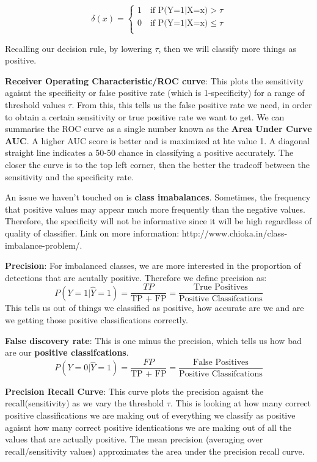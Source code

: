 \documentclass[11pt, oneside]{article}
\theoremstyle{definition}
\begin{document}
\[
\delta(x) = \left\{
\begin{array}{ll}
      1  \quad \textrm{if P(Y=1$|$X=x)} > \tau \\
      0  \quad \textrm{if P(Y=1$|$X=x)} \leq \tau\\
\end{array}
\right.
\]

Recalling our decision rule, by lowering $\tau$, then we will classify more things as positive.

\textbf{Receiver Operating Characteristic/ROC curve}: This plots the sensitivity agaisnt the specificity or false positive rate (which is 1-specificity) for a range of threshold values $\tau$. From this, this tells us the false positive rate we need, in order to obtain a certain sensitivity or true positive rate we want to get. We can summarise the ROC curve as a single number known as the \textbf{Area Under Curve AUC}. A higher AUC score is better and is maximized at hte value 1. A diagonal straight line indicates a 50-50 chance in classifying a positive accurately. The closer the curve is to the top left corner, then the better the tradeoff between the sensitivity and the specificity rate.

An issue we haven't touched on is \textbf{class imabalances}. Sometimes, the frequency that positive values may appear much more frequently than the negative values. Therefore, the specificity will not be informative since it will be high regardless of quality of classifier. Link on more information: http://www.chioka.in/class-imbalance-problem/.

\textbf{Precision}: For imbalanced classes, we are more interested in the proportion of detections that are acutally positive. Therefore we define precision as:
\begin{equation}
  P(Y=1|\hat{Y}=1) = \frac{TP}{\text{TP + FP}} = \frac{\text{True Positives}}{\text{Positive Classifcations}}
\end{equation}
This tells us out of things we classified as positive, how accurate are we and are we getting those positive classifications correctly.

\textbf{False discovery rate}: This is one minus the precision, which tells us how bad are our \textbf{positive classifcations}.
\begin{equation}
  P(Y=0|\hat{Y}=1) = \frac{FP}{\text{TP + FP}} = \frac{\text{False Positives}}{\text{Positive Classifcations}}
\end{equation}

\textbf{Precision Recall Curve}: This curve plots the precision agaisnt the recall(sensitivity) as we vary the threshold $\tau$. This is looking at how many correct positive classifications we are making out of everything we classify as positive agaisnt how many correct positive identications we are making out of all the values that are actually positive. The mean precision (averaging over recall/sensitivity values) approximates the area under the precision recall curve.
\end{document}
